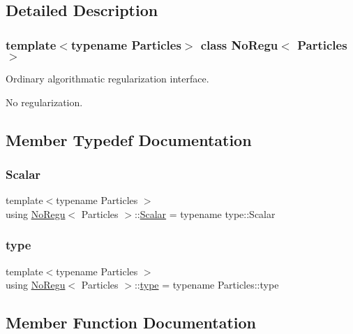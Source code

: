 \subsection{Detailed Description}
\subsubsection*{template$<$typename Particles$>$\newline
class No\+Regu$<$ Particles $>$}

Ordinary algorithmatic regularization interface. 

No regularization. 

\subsection{Member Typedef Documentation}
\mbox{\label{class_no_regu_af6597c7ec828f8630895903da9251be4}} 
\subsubsection{\texorpdfstring{Scalar}{Scalar}}
{\footnotesize\ttfamily template$<$typename Particles $>$ \\
using \mbox{\hyperlink{class_no_regu}{No\+Regu}}$<$ Particles $>$\+::\mbox{\hyperlink{class_no_regu_af6597c7ec828f8630895903da9251be4}{Scalar}} =  typename type\+::\+Scalar}

\mbox{\label{class_no_regu_acdfb043f122617376d117cadd040e220}} 
\subsubsection{\texorpdfstring{type}{type}}
{\footnotesize\ttfamily template$<$typename Particles $>$ \\
using \mbox{\hyperlink{class_no_regu}{No\+Regu}}$<$ Particles $>$\+::\mbox{\hyperlink{class_no_regu_acdfb043f122617376d117cadd040e220}{type}} =  typename Particles\+::type}



\subsection{Member Function Documentation}
\mbox{\label{class_no_regu_aeae8b6811fa8b50e0d8cdbd2ae9a0d9c}} 
